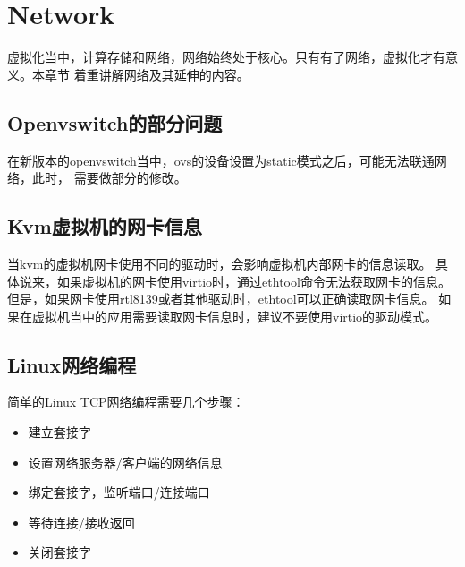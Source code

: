 \chapter{Network}
虚拟化当中，计算存储和网络，网络始终处于核心。只有有了网络，虚拟化才有意义。本章节
着重讲解网络及其延伸的内容。

\section{Openvswitch的部分问题}
在新版本的openvswitch当中，ovs的设备设置为static模式之后，可能无法联通网络，此时，
需要做部分的修改。

\section{Kvm虚拟机的网卡信息}
当kvm的虚拟机网卡使用不同的驱动时，会影响虚拟机内部网卡的信息读取。
具体说来，如果虚拟机的网卡使用virtio时，通过ethtool命令无法获取网卡的信息。
但是，如果网卡使用rtl8139或者其他驱动时，ethtool可以正确读取网卡信息。
如果在虚拟机当中的应用需要读取网卡信息时，建议不要使用virtio的驱动模式。

\section{Linux网络编程}
简单的Linux TCP网络编程需要几个步骤：
\begin{itemize}
  \item 建立套接字
  \item 设置网络服务器/客户端的网络信息
  \item 绑定套接字，监听端口/连接端口
  \item 等待连接/接收返回
  \item 关闭套接字
\end{itemize}

